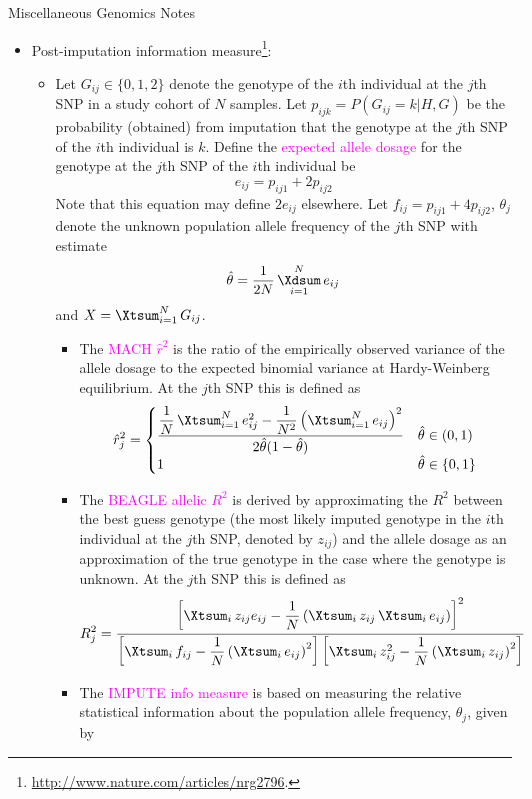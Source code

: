 \documentclass[UTF8]{book}
\date{}
\DeclareMathOperator*{\Xsum}{\mathchoice{\Xdsum}{\Xtsum}{\Xtsum}{\Xtsum}}
\newcommand{\et}{&}
\newcommand{\f}{^2}
\begin{document}
\begin{center}
\Large{Miscellaneous Genomics Notes}
\end{center}
\begin{itemize}
\item Post-imputation information measure\footnote{\url{http://www.nature.com/articles/nrg2796}.}:
\begin{itemize}
\item Let $G_{ij}\in \{0,1,2\}$ denote the genotype of the $i$th individual at the $j$th SNP in a study cohort of $N$ samples. Let $p_{ijk} = P(G_{ij}=k|H,G)$ be the probability (obtained) from imputation that the genotype at the $j$th SNP of the $i$th individual is $k$. Define the \textcolor{magenta}{expected allele dosage} for the genotype at the $j$th SNP of the $i$th individual be
$$
e_{ij} = p_{ij1} + 2p_{ij2}
$$
Note that this equation may define $2e_{ij}$ elsewhere. Let $f_{ij} = p_{ij1} + 4p_{ij2}$, $\theta_j$ denote the unknown population allele frequency of the $j$th SNP with estimate
$$
\hat{\theta} = \dfrac{1}{2N}\Xsum_{i=1}^Ne_{ij}
$$
and $X=\Xsum_{i=1}^NG_{ij}$.
\begin{itemize}
	\item The \textcolor{magenta}{MACH $\hat{r}^2$} is the ratio of the empirically observed variance of the allele dosage to the expected binomial variance at Hardy-Weinberg equilibrium. At the $j$th SNP this is defined as 
	$$
		\hat{r}_j\f = \begin{cases}
			\dfrac{\dfrac{1}{N}\Xsum_{i=1}^N e_{ij}\f - \dfrac{1}{N\f}\left(\Xsum_{i=1}^Ne_{ij}\right)\f}{2\hat{\theta}(1-\hat{\theta})} \et \hat{\theta}\in (0,1)\\
			1 \et \hat{\theta} \in \{0,1\}
		\end{cases}	
	$$
	\item The \textcolor{magenta}{BEAGLE allelic $R\f$} is derived by approximating the $R\f$ between the best guess genotype (the most likely imputed genotype in the $i$th individual at the $j$th SNP, denoted by $z_{ij}$) and the allele dosage as an approximation of the true genotype in the case where the genotype is unknown. At the $j$th SNP this is defined as 
	$$
		R_j\f = \dfrac{\left[\Xsum_iz_{ij}e_{ij}-\dfrac{1}{N}\left(\Xsum_iz_{ij}\Xsum_ie_{ij}\right)\right]\f}{\left[\Xsum_if_{ij}-\dfrac{1}{N}\left(\Xsum_ie_{ij}\right)\f\right]\left[\Xsum_iz_{ij}\f-\dfrac{1}{N}\left(\Xsum_iz_{ij}\right)\f\right]}
	$$
	\item The \textcolor{magenta}{IMPUTE info measure} is based on measuring the relative statistical information about the population allele frequency, $\theta_j$, given by

\end{itemize}
\end{itemize}
\end{itemize}
\end{document}
